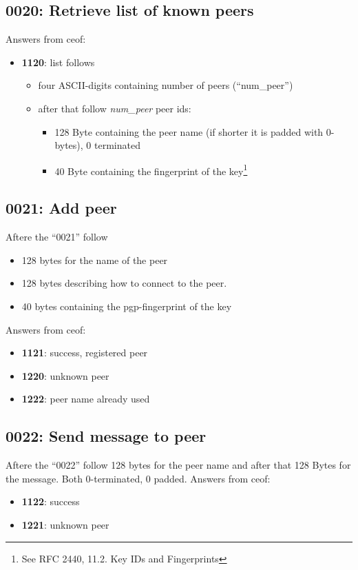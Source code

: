 \documentclass[12pt,a4paper]{book}
\begin{document}
\subsection{0020: Retrieve list of known peers}
Answers from ceof:
\begin{itemize}
\item \textbf{1120}: list follows
\begin{itemize}
\item four ASCII-digits containing number of peers ("`num\_peer"')
\item after that follow \textit{num\_peer} peer ids:
\begin{itemize}
\item 128 Byte containing the peer name (if shorter it is padded with 0-bytes), 0 terminated
\item 40 Byte containing the fingerprint of the
key\footnote{See RFC 2440, 11.2. Key IDs and Fingerprints}
\end{itemize}
\end{itemize}
\end{itemize}
\subsection{0021: Add peer}
Aftere the "`0021"' follow

\begin{itemize}
\item 128 bytes for the name of the peer
\item 128 bytes describing how to connect to the peer.
\item 40 bytes  containing the pgp-fingerprint of the key
\end{itemize}
Answers from ceof:
\begin{itemize}
\item \textbf{1121}: success, registered peer
\item \textbf{1220}: unknown peer
\item \textbf{1222}: peer name already used
\end{itemize}
\subsection{0022: Send message to peer}
Aftere the "`0022"' follow 128 bytes for the peer name
and after that 128 Bytes for the message.
Both 0-terminated, 0 padded.
Answers from ceof:
\begin{itemize}
\item \textbf{1122}: success
\item \textbf{1221}: unknown peer
\end{itemize}
\end{document}
